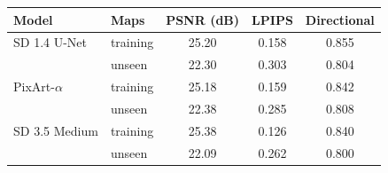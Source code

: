 \begin{tabular}{llccc}
\toprule
Model & Maps & PSNR (dB) & LPIPS & Directional \\
\midrule
SD 1.4 U-Net & training & 25.20 & 0.158 & 0.855 \\
 & unseen & 22.30 & 0.303 & 0.804 \\
PixArt-$\alpha$ & training & 25.18 & 0.159 & 0.842 \\
 & unseen & 22.38 & 0.285 & 0.808 \\
SD 3.5 Medium & training & 25.38 & 0.126 & 0.840 \\
 & unseen & 22.09 & 0.262 & 0.800 \\
\bottomrule
\end{tabular}
